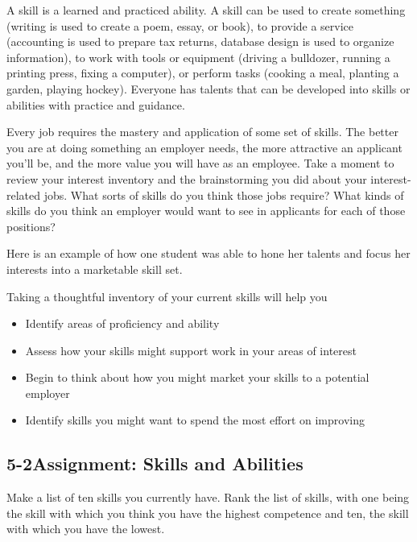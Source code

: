 A skill is a learned and practiced ability. A skill can be used to create something (writing is used to create a poem, essay, or book), to provide a service (accounting is used to prepare tax returns, database design is used to organize information), to work with tools or equipment (driving a bulldozer, running a printing press, fixing a computer), or perform tasks (cooking a meal, planting a garden, playing hockey). Everyone has talents that can be developed into skills or abilities with practice and guidance.

Every job requires the mastery and application of some set of skills. The better you are at doing something an employer needs, the more attractive an applicant you'll be, and the more value you will have as an employee. Take a moment to review your interest inventory and the brainstorming you did about your interest-related jobs. What sorts of skills do you think those jobs require? What kinds of skills do you think an employer would want to see in applicants for each of those positions?

Here is an example of how one student was able to hone her talents and focus her interests into a marketable skill set.

Taking a thoughtful inventory of your current skills will help you
\begin{itemize}[leftmargin=1.0cm]
	\item Identify areas of proficiency and ability
	\item Assess how your skills might support work in your areas of interest
	\item Begin to think about how you might market your skills to a potential employer
	\item Identify skills you might want to spend the most effort on improving
\end{itemize}

\pagebreak \subsection*{5-2\quad Assignment: Skills and Abilities}
Make a list of ten skills you currently have. Rank the list of skills, with one being the skill with which you think you have the highest competence and ten, the skill with which you have the lowest.

